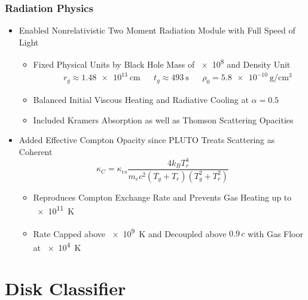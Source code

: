 	\begin{frame}
		\frametitle{Radiation Physics}
		\begin{itemize}
			\item<2-> Enabled Nonrelativistic Two Moment Radiation Module with Full Speed of Light
			\begin{itemize}
				\item<3-> Fixed Physical Units by Black Hole Mass of \qty{e8}{\solarmass} and Density Unit
						  \begin{align*}&&&& r_g \approx \qty{1.48e13}{\centi\meter} && t_g \approx \qty{493}{\second} &&
						  \rho_0 = \qty{5.8e-10}{\gram\per\centi\meter\cubed} &&&&\end{align*}
				\item<4-> Balanced Initial Viscous Heating and Radiative Cooling at $\alpha = 0.5$
				\item<5-> Included Kramers Absorption as well as Thomson Scattering Opacities
			\end{itemize}
			\item<6-> Added Effective Compton Opacity since PLUTO Treats Scattering as Coherent
					  $$\kappa_C = \kappa_{es} \frac{4 k_B T_r^4}{m_e c^2 \left(T_g + T_r\right) \left(T_g^2 + T_r^2\right)}$$
			\vspace{-1.5ex}
			\begin{itemize}
				\item<7-> Reproduces Compton Exchange Rate and Prevents Gas Heating up to \qty{e11}{\kelvin}
				\item<8-> Rate Capped above \qty{e9}{\kelvin} and Decoupled above $0.9 \, c$ with Gas Floor at \qty{e4}{\kelvin}
			\end{itemize}
		\end{itemize}
	\end{frame}

	\section{Disk Classifier}

